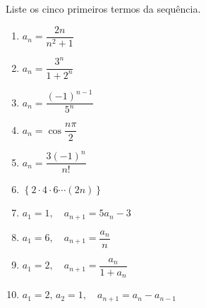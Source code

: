 \item\label{norms}
Liste os cinco primeiros termos da sequência.

\begin{multicols}{2}
    \begin{enumerate}
        \item $a_n = \dfrac{2n}{n^2 + 1}$
        \item $a_n = \dfrac{3^n}{1 + 2^n}$
        \item $a_n = \dfrac{(-1)^{n-1}}{5^n}$
        \item $a_n = \cos{\dfrac{n\pi}{2}}$
        \item $a_n = \dfrac{3(-1)^n}{n!}$
        \item $\left\{ 2 \cdot 4 \cdot 6 \cdots (2n)\right\}$
        \item $a_1 = 1, \quad a_{n+1} = 5a_n - 3$
        \item $a_1 = 6, \quad a_{n+1} = \dfrac{a_n}{n}$
        \item $a_1 = 2, \quad a_{n+1} = \dfrac{a_n}{1 + a_n}$
        \item $a_1 = 2, \, a_2 = 1, \quad a_{n+1} = a_n - a_{n-1}$
    \end{enumerate}
\end{multicols}